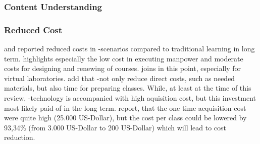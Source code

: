 \subsubsection{Content Understanding}

% 
\subsubsection{Reduced Cost}
\cite{Leblanc.2010} and \cite{MartinGutierrez.2011} reported reduced costs in \ARns-scenarios compared to traditional learning in long term. \cite{Chen.2012} highlights especially the low cost in executing manpower and moderate costs for designing and renewing of courses.\autocite[cf.][640]{Chen.2012} \cite{Andujar.2011} joins in this point, especially for virtual laboratories.\autocite[cf.][492]{Andujar.2011} \cite{Andujar.2011} add that \ARns-\apps not only reduce direct costs, such as needed materials, but also time for preparing classes. While, at least at the time of this review, \ARns-technology is accompanied with high aquisition cost, but this investment most likely paid of in the long term. \cite{Leblanc.2010} report, that the one time acquisition cost were quite high (25.000 US-Dollar)\autocite[253]{Leblanc.2010}, but the cost per class could be lowered by 93,34\% (from 3.000 US-Dollar to 200 US-Dollar)\autocite[253]{Leblanc.2010} which will lead to cost reduction.